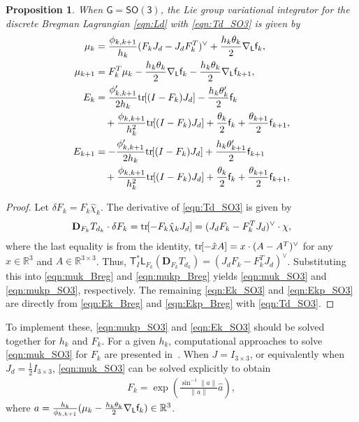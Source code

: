 \documentclass[letterpaper, 10pt, conference]{ieeeconf}
\newcommand{\bracket}[1]{\ensuremath{\left[ #1 \right]}}
\newcommand{\tr}[1]{\mbox{tr}\ensuremath{\negthickspace\bracket{#1}}}
\newcommand{\G}{\ensuremath{\mathsf{G}}}
\newcommand{\SO}{\ensuremath{\mathsf{SO(3)}}}
\newcommand{\T}{\ensuremath{\mathsf{T}}}
\renewcommand{\L}{\ensuremath{\mathsf{L}}}
\renewcommand{\Re}{\ensuremath{\mathbb{R}}}
\newcommand{\D}{\ensuremath{\mathbf{D}}}
\newtheorem{prop}{Proposition}
\begin{document}
\begin{prop}
    When $\G=\SO$, the Lie group variational integrator for the discrete Bregman Lagrangian \eqref{eqn:Ld} with \eqref{eqn:Td_SO3} is given by
\begin{align}
    \mu_k & =\frac{\phi_{k,k+1}}{h_k } (F_k J_d - J_dF_k^T)^\vee + \frac{h_k\theta_k }{2} \nabla_\L \obj_k, \label{eqn:muk_SO3} \\
    \mu_{k+1}  & = F_k^T \mu_k -\frac{h_k\theta_k}{2}\nabla_\L \obj_k - \frac{h_k\theta_k}{2} \nabla_\L \obj_{k+1}, \label{eqn:mukp_SO3}\\
    E_{k} & = \frac{\phi'_{k,k+1}}{ 2 h_k} \tr{(I-F_k)J_d} -\frac{h_k\theta'_{k}}{2} \obj_{k} \nonumber\\\
          & \quad + \frac{\phi_{k,k+1}}{h_k^2} \tr{(I-F_k)J_d} + \frac{\theta_k}{2}\obj_k + \frac{\theta_{k+1}}{2}\obj_{k+1}, \label{eqn:Ek_SO3}\\
    E_{k+1} & = -\frac{\phi'_{k,k+1}}{ 2 h_k} \tr{(I-F_k)J_d} +\frac{h_k\theta'_{k+1}}{2} \obj_{k+1}\nonumber \\\
            & \quad + \frac{\phi_{k,k+1}}{h_k^2} \tr{(I-F_k)J_d} +\frac{\theta_k}{2}\obj_k + \frac{\theta_{k+1}}{2}\obj_{k+1}, \label{eqn:Ekp_SO3}
\end{align}
\end{prop}
\begin{proof}
    Let $\delta F_k = F_k \hat\chi_k$.
    The derivative of \eqref{eqn:Td_SO3} is given by
    \begin{align*}
        \D_{F_k} T_{d_k} \cdot \delta F_k = \tr{-F_k\hat\chi_k J_d} = (J_dF_k - F_k^T J_d)^\vee \cdot \chi,
    \end{align*}
    where the last equality is from the identity, $\tr{-\hat x A} = x\cdot (A-A^T)^\vee$ for any $x\in\Re^3$ and $A\in\Re^{3\times 3}$.
    Thus, $\T^*_I \L_{F_k} (\D_{F_k} T_{d_k}) = (J_dF_k - F_k^T J_d)^\vee $. 
    Substituting this into \eqref{eqn:muk_Breg} and \eqref{eqn:mukp_Breg} yields \eqref{eqn:muk_SO3} and \eqref{eqn:mukp_SO3}, respectively. 
    The remaining \eqref{eqn:Ek_SO3} and \eqref{eqn:Ekp_SO3} are directly from \eqref{eqn:Ek_Breg} and \eqref{eqn:Ekp_Breg} with \eqref{eqn:Td_SO3}.
\end{proof}
To implement these, \eqref{eqn:mukp_SO3} and \eqref{eqn:Ek_SO3} should be solved together for $h_k$ and $F_k$.
For a given $h_k$, computational approaches to solve \eqref{eqn:muk_SO3} for $F_k$ are presented in~\cite[Sec 3.3.8]{Lee08}.
When $J=I_{3\times 3}$, or equivalently when $J_d = \frac{1}{2}I_{3\times 3}$, \eqref{eqn:muk_SO3} can be solved explicitly to obtain
\begin{align}
    F_k = \exp (\frac{\sin^{-1}\|a\|}{\|a\|}\hat a),
\end{align}
where $a = \frac{h_k}{\phi_{k,k+1}} (\mu_k - \frac{h_k\theta_k}{2}\nabla_\L \obj_k)\in\Re^3$.
\end{document}

